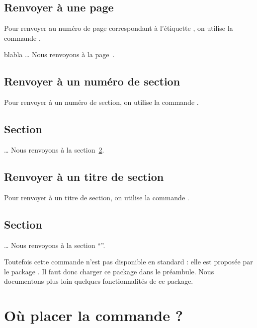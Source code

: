 \subsection{Renvoyer à une page}

Pour renvoyer au numéro de page correspondant à l'étiquette , on utilise la commande .

\begin{latexcode}
blabla \label{etiquette}
…
Nous renvoyons à la page~\pageref{etiquette}.
\end{latexcode}

\subsection{Renvoyer à un numéro de section}

Pour renvoyer à un numéro de section, on utilise la commande .

\begin{latexcode}
\section{Section} \label{etiquette}
…
Nous renvoyons à la section~\ref{etiquette}.
\end{latexcode}
 
\subsection{Renvoyer à un titre de section}\label{renvoititre}

Pour renvoyer à un titre de section, on utilise la commande .

\begin{latexcode}
\section{Section} \label{etiquette}
…
Nous renvoyons à la section  \enquote{}.
\end{latexcode}

Toutefois cette commande n'est pas disponible en standard : elle est proposée par le package . Il faut donc charger ce package dans le préambule. Nous documentons plus loin quelques fonctionnalités de ce package.


\section[Où placer la commande \oldcs{label} ?]{Où placer la commande  ?}

